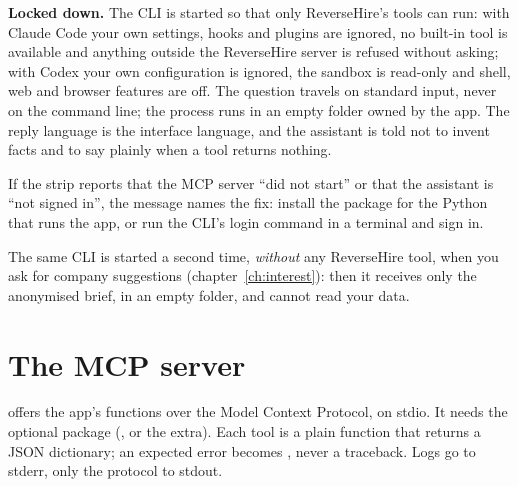 \textbf{Locked down.} The CLI is started so that only ReverseHire's tools can run: with
Claude Code your own settings, hooks and plugins are ignored, no built-in tool is
available and anything outside the ReverseHire server is refused without asking; with
Codex your own configuration is ignored, the sandbox is read-only and shell, web and
browser features are off. The question travels on standard input, never on the command
line; the process runs in an empty folder owned by the app. The reply language is the
interface language, and the assistant is told not to invent facts and to say plainly when a
tool returns nothing.

\begin{infobox}
If the strip reports that the MCP server ``did not start'' or that the assistant is
``not signed in'', the message names the fix: install the  package for the
Python that runs the app, or run the CLI's login command in a terminal and sign in.
\end{infobox}

\begin{infobox}
The same CLI is started a second time, \emph{without} any ReverseHire tool, when you ask for company suggestions
(chapter~\ref{ch:interest}): then it receives only the anonymised brief, in an empty folder, and cannot read your data.
\end{infobox}

\section{The MCP server}
 offers the app's functions over the Model Context Protocol, on
stdio. It needs the optional  package (, or the 
extra). Each tool is a plain function that returns a JSON dictionary; an expected error
becomes , never a traceback. Logs go to stderr, only the protocol
to stdout.

